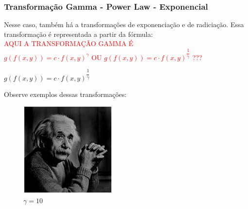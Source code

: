 \documentclass[a4paper, 12pt]{article}
\begin{document}
\subsubsection{Transformação Gamma - Power Law - Exponencial}
Nesse caso, também há a transformações de exponenciação e de radiciação. Essa transformação é representada a partir da fórmula:
\\
\large{\textcolor{red}{AQUI A TRANSFORMAÇÃO GAMMA É \\ $g(f(x,y)) = c \cdot f(x,y)^{\gamma}$ OU $g(f(x,y)) = c \cdot f(x,y)^{\dfrac{1}{\gamma}}$ ???}}
\begin{center}
	$g(f(x,y)) = c \cdot f(x,y)^{\dfrac{1}{\gamma}}$
\end{center}
Observe exemplos dessas transformações:
\begin{figure}[!htb]
	\centering
	  	\includegraphics[width=\linewidth]{images/einsteinEscuro.jpg}
	  	\caption{$\gamma = 10$}
	\endminipage\hspace{1cm}

\end{figure}
\end{document}
